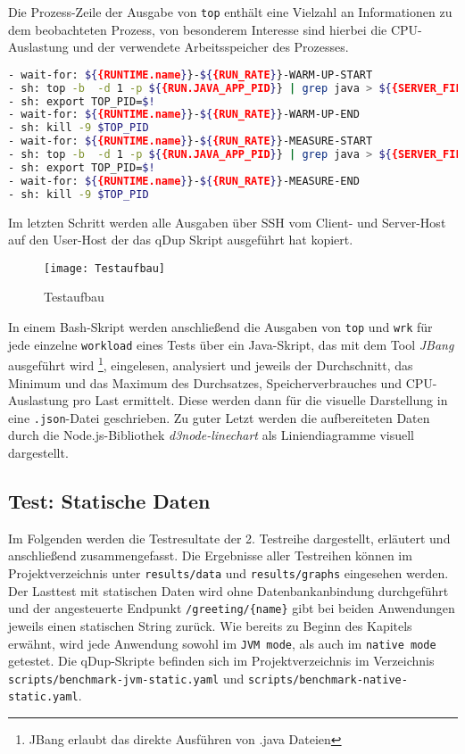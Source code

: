 Die Prozess-Zeile der Ausgabe von \verb|top| enthält eine Vielzahl an Informationen zu dem beobachteten Prozess, von besonderem
Interesse sind hierbei die CPU-Auslastung und der verwendete Arbeitsspeicher des Prozesses. \parencite{linuxTopManual}

\begin{lstlisting}[language=sh, caption=Auszug des qDup Skripts capture-platform-stats, captionpos=b]
- wait-for: ${{RUNTIME.name}}-${{RUN_RATE}}-WARM-UP-START
- sh: top -b  -d 1 -p ${{RUN.JAVA_APP_PID}} | grep java > ${{SERVER_FILE_PATH}}/output/${{RUNTIME.name}}-${{RUN_RATE}}-WARM-UP-top.out &
- sh: export TOP_PID=$!
- wait-for: ${{RUNTIME.name}}-${{RUN_RATE}}-WARM-UP-END
- sh: kill -9 $TOP_PID
- wait-for: ${{RUNTIME.name}}-${{RUN_RATE}}-MEASURE-START
- sh: top -b  -d 1 -p ${{RUN.JAVA_APP_PID}} | grep java > ${{SERVER_FILE_PATH}}/output/${{RUNTIME.name}}-${{RUN_RATE}}-MEASURE-top.out &
- sh: export TOP_PID=$!
- wait-for: ${{RUNTIME.name}}-${{RUN_RATE}}-MEASURE-END
- sh: kill -9 $TOP_PID
  \end{lstlisting}

Im letzten Schritt werden alle Ausgaben über SSH vom Client- und Server-Host auf den User-Host der das qDup Skript ausgeführt hat kopiert.

\begin{figure}[ht]
    \centering
    \texttt{[image: Testaufbau]}
    \caption{Testaufbau}
\end{figure}

In einem Bash-Skript werden anschließend die Ausgaben von \verb|top| und \verb|wrk| für jede einzelne \verb|workload| eines Tests
über ein Java-Skript, das mit dem Tool \textit{JBang} ausgeführt wird \footnote{JBang erlaubt das direkte Ausführen von .java Dateien},
eingelesen, analysiert und jeweils der Durchschnitt, das Minimum und das Maximum des Durchsatzes, Speicherverbrauches und CPU-Auslastung pro Last ermittelt.
Diese werden dann für die visuelle Darstellung in eine \verb|.json|-Datei geschrieben.
Zu guter Letzt werden die aufbereiteten Daten durch die Node.js-Bibliothek \textit{d3node-linechart} als Liniendiagramme visuell dargestellt.

\subsection{Test: Statische Daten}
\label{subsection:statische_daten}
Im Folgenden werden die Testresultate der 2. Testreihe dargestellt, erläutert und anschließend zusammengefasst.
Die Ergebnisse aller Testreihen können im Projektverzeichnis unter \verb|results/data| und \verb|results/graphs| eingesehen werden.
Der Lasttest mit statischen Daten wird ohne Datenbankanbindung durchgeführt und der angesteuerte Endpunkt \verb|/greeting/{name}| gibt bei beiden Anwendungen
jeweils einen statischen String zurück. Wie bereits zu Beginn des Kapitels erwähnt, wird jede Anwendung sowohl im \verb|JVM mode|, als auch im
\verb|native mode| getestet.
Die qDup-Skripte befinden sich im Projektverzeichnis im Verzeichnis \verb|scripts/benchmark-jvm-static.yaml| und
\verb|scripts/benchmark-native-static.yaml|.

